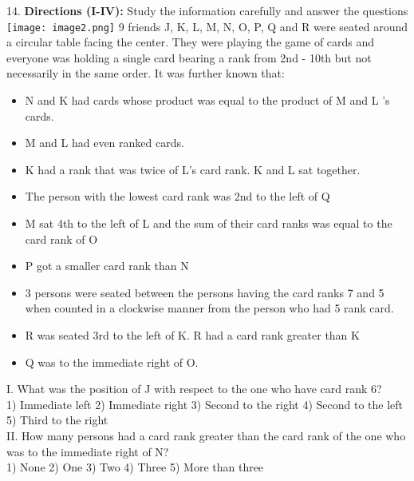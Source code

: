 \documentclass[
]{article}
\begin{document}
14. \textbf{Directions (I-IV):} Study the information carefully and answer the questions\\
\texttt{[image: image2.png]}
9 friends J, K, L, M, N, O, P, Q and R were seated around a circular table facing the center.
They were playing the game of cards and everyone was holding a single card bearing a rank
from 2nd - 10th but not necessarily in the same order. It was further known that:\\
\begin{itemize}
    \item N and K had cards whose product was equal to the product of M and L 's cards.
    \item M and L had even ranked cards.
    \item K had a rank that was twice of L's card rank. K and L sat together.
    \item The person with the lowest card rank was 2nd to the left of Q
    \item M sat 4th to the left of L and the sum of their card ranks was equal to the card rank of O
    \item P got a smaller card rank than N
    \item 3 persons were seated between the persons having the card ranks 7 and 5 when counted in a clockwise manner from the person who had 5 rank card.
    \item R was seated 3rd to the left of K. R had a card rank greater than K
    \item Q was to the immediate right of O.
\end{itemize}

I. What was the position of J with respect to the one who have card rank 6?\\
1) Immediate left \hspace{2mm}2) Immediate right
\hspace{2mm}3) Second to the right \hspace{2mm}4) Second to the left
\hspace{2mm}5) Third to the right\\

II. How many persons had a card rank greater than the card rank of the one who was to
the immediate right of N?\\
1) None \hspace{2mm}2) One \hspace{2mm}3) Two \hspace{2mm}4) Three \hspace{2mm}5) More than three\\
\end{document}
